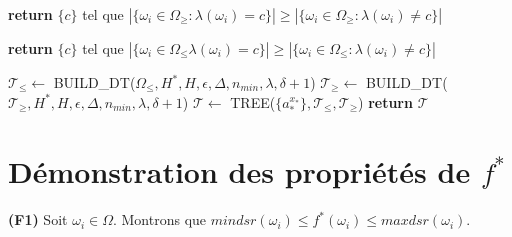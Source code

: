 \documentclass[a4paper]{article}
\begin{document}
\begin{algorithm}[H]
\begin{algorithmic}
    \State \textbf{return} $\{c\}$ tel que $|\{\omega_i \in \Omega_{\geq}:
    \lambda(\omega_i) = c\}| \geq |\{\omega_i \in \Omega_{\geq}:
    \lambda(\omega_i) \neq c\}|$
\EndIf

    \State \textbf{return} $\{c\}$ tel que $|\{\omega_i \in \Omega_{\leq}
    \lambda(\omega_i) = c\}| \geq |\{\omega_i \in \Omega_{\leq}:
    \lambda(\omega_i) \neq c\}|$
\EndIf

\State $\mathcal{T}_{\leq}\gets$ BUILD\_DT($\Omega_{\leq}, H^*, H, \epsilon, \Delta,
    n_{min}, \lambda, \delta +1$) 
\State $\mathcal{T}_{\geq}\gets$
    BUILD\_DT($\mathcal{T}_{\geq}, H^*, H, \epsilon, \Delta, n_{min}, \lambda, \delta
    +1$)
\State $\mathcal{T} \gets$ TREE($\{a^{x_*}_*\}, \mathcal{T}_{\leq}, \mathcal{T}_{\geq}$)
\State \textbf{return} $\mathcal{T}$

\EndProcedure
\end{algorithmic}
\end{algorithm}

\section{Démonstration des propriétés de $f^*$}
\label{appendix:demo-f}

\textbf{(F1)} Soit $\omega_i \in \Omega$. Montrons que $mindsr(\omega_i) \leq
f^*(\omega_i) \leq maxdsr(\omega_i)$.
\end{document}
